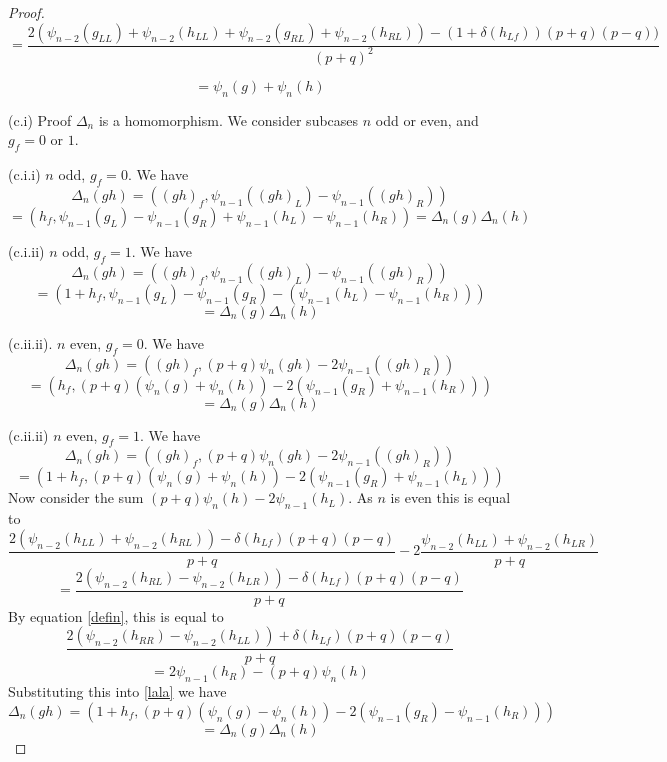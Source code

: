 \documentclass[10pt,a4paper]{amsart}
\begin{document}
\begin{proof}
    $$ = \frac{2(\psi_{n-2}(g_{LL}) + \psi_{n-2}(h_{LL}) +  \psi_{n-2}(g_{RL}) + \psi_{n-2}(h_{RL})) - (1 + \delta(h_{Lf}))(p+q)(p-q)) }{(p+q)^2}$$

    $$= \psi_n(g) + \psi_n(h)$$
    
    \vspace{1em}

    (c.i) Proof $\Delta_n$ is a homomorphism. We consider subcases $n$ odd or even, and $g_f = 0$ or $1$. 

    (c.i.i) $n$ odd, $g_f = 0$. We have
    $$\Delta_n(gh) = ((gh)_f, \psi_{n-1}((gh)_L) - \psi_{n-1}((gh)_R))$$
    $$ = (h_f, \psi_{n-1}(g_L) - \psi_{n-1}(g_R) + \psi_{n-1}(h_L)  - \psi_{n-1}(h_R)) = \Delta_n(g)\Delta_n(h)$$

    (c.i.ii) $n$ odd, $g_f = 1$. We have 
    $$\Delta_n(gh) = ((gh)_f, \psi_{n-1}((gh)_L) - \psi_{n-1}((gh)_R))$$
    $$ = (1 + h_f, \psi_{n-1}(g_L) - \psi_{n-1}(g_R) - (\psi_{n-1}(h_L) - \psi_{n-1}(h_R)))$$
    $$ = \Delta_n(g)\Delta_n(h)$$

    (c.ii.ii). $n$ even, $g_f = 0$. We have 
    $$\Delta_n(gh) = ((gh)_f, (p+q)\psi_{n}(gh) - 2\psi_{n-1}((gh)_R))$$
    $$= (h_f, (p+q)(\psi_{n}(g) + \psi_n(h)) - 2(\psi_{n-1}(g_R) + \psi_{n-1}(h_R)))$$
    $$= \Delta_n(g)\Delta_n(h)$$

    (c.ii.ii) $n$ even, $g_f = 1$. We have
    $$\Delta_n(gh) = ((gh)_f, (p+q)\psi_{n}(gh) - 2\psi_{n-1}((gh)_R))$$
    \begin{equation}\label{lala} = (1+h_f, (p+q)(\psi_{n}(g) + \psi_n(h)) - 2(\psi_{n-1}(g_R) + \psi_{n-1}(h_L)))\end{equation}
    Now consider the sum $(p+q)\psi_n(h) - 2\psi_{n-1}(h_L)$. As $n$ is even this is equal to 
    $$\frac{2(\psi_{n-2}(h_{LL}) + \psi_{n-2}(h_{RL})) - \delta(h_{Lf})(p+q)(p-q)}{p+q} - 2\frac{\psi_{n-2}(h_{LL}) + \psi_{n-2}(h_{LR})}{p+q}$$
    $$=\frac{2(\psi_{n-2}(h_{RL}) - \psi_{n-2}(h_{LR})) - \delta(h_{Lf})(p+q)(p-q)}{p+q}$$
    By equation \ref{defin}, this is equal to
    $$\frac{2(\psi_{n-2}(h_{RR}) - \psi_{n-2}(h_{LL})) + \delta(h_{Lf})(p+q)(p-q)}{p+q}$$
    $$ = 2\psi_{n-1}(h_R) - (p+q)\psi_n(h)$$
    Substituting this into \ref{lala} we have 
    $$\Delta_n(gh) = (1+h_f, (p+q)(\psi_n(g) - \psi_n(h)) - 2(\psi_{n-1}(g_R) - \psi_{n-1}(h_R)))$$
    $$ = \Delta_n(g)\Delta_n(h)$$

\end{proof}
\end{document}
